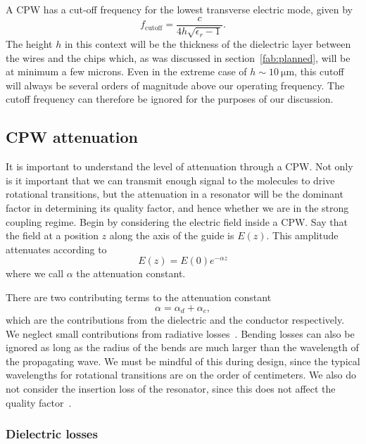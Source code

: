 A CPW has a cut-off frequency for the lowest transverse electric mode, given
by~\cite{Simons2004}
%
\begin{equation}
  f_\text{cutoff} = \frac{c}{4h\sqrt{\epsilon_r - 1}}.
\end{equation}
%
The height $h$ in this context will be the thickness of the dielectric layer
between the wires and the chips which, as was discussed in
section~\ref{fab:planned},
will be at minimum a few microns.  Even in the extreme case of
$h\sim\SI{10}{\micro\meter}$, this cutoff will always be several orders of
magnitude above our operating frequency.  The cutoff frequency can therefore be
ignored for the purposes of our discussion.

\subsection{CPW attenuation}

It is important to understand the level of attenuation through a CPW. Not only
is it important that we can transmit enough signal to the molecules to drive 
rotational transitions, but the attenuation in a resonator will be the dominant
factor in determining its quality factor, and hence whether we are in the
strong coupling regime. Begin by considering the electric field inside a CPW.
Say that the field at a position $z$ along the axis of the guide is $E(z)$.
This amplitude attenuates according to
%
\begin{equation}
  E(z) = E(0)e^{-\alpha z}
\end{equation}
%
where we call $\alpha$ the attenuation constant.

There are two contributing terms to the attenuation constant
%
\begin{equation}
  \alpha = \alpha_d + \alpha_c,
\end{equation}
%
which are the contributions from the dielectric and the conductor respectively. We
neglect small contributions from radiative losses~\cite{Frankel1991}. Bending
losses can also be ignored as long as the radius of the bends are much larger
than the wavelength of the propagating wave. We must be mindful of this during
design, since the typical wavelengths for rotational transitions are on the
order of centimeters.  We also do not consider the insertion loss of the
resonator, since this does not affect the quality
factor~\cite{doi:10.1063/1.3010859}.

\subsubsection{Dielectric losses}

